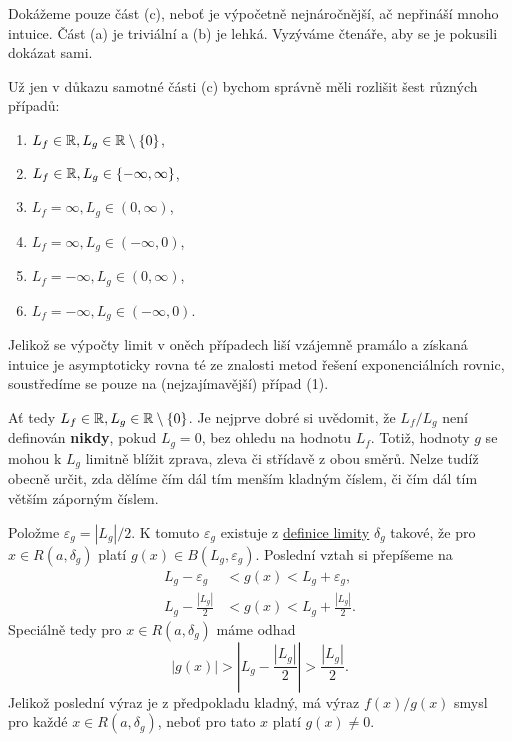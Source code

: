 \begin{thmproof}
 Dokážeme pouze část (c), neboť je výpočetně nejnáročnější, ač nepřináší mnoho
 intuice. Část (a) je triviální a (b) je lehká. Vyzýváme čtenáře, aby se je
 pokusili dokázat sami.

 Už jen v důkazu samotné části (c) bychom správně měli rozlišit šest různých
 případů:
 \begin{enumerate}
  \item $L_f \in \mathbb{R}, L_g \in \mathbb{R} \setminus \{0\}$,
  \item $L_f \in \mathbb{R}, L_g \in \{-\infty,\infty\}$,
  \item $L_f = \infty, L_g \in (0,\infty)$,
  \item $L_f = \infty, L_g \in (-\infty,0)$,
  \item $L_f = -\infty, L_g \in (0,\infty)$,
  \item $L_f = -\infty, L_g \in (-\infty,0)$.
 \end{enumerate}
 Jelikož se výpočty limit v oněch případech liší vzájemně pramálo a získaná
 intuice je asymptoticky rovna té ze znalosti metod řešení exponenciálních
 rovnic, soustředíme se pouze na (nejzajímavější) případ (1).

 Ať tedy $L_f \in \mathbb{R}, L_g \in \mathbb{R} \setminus \{0\}$. Je nejprve dobré si uvědomit,
 že $L_f / L_g$ není definován \textbf{nikdy}, pokud $L_g = 0$, bez ohledu na
 hodnotu $L_f$. Totiž, hodnoty $g$ se mohou k $L_g$ limitně blížit zprava,
 zleva či střídavě z obou směrů. Nelze tudíž obecně určit, zda dělíme čím dál
 tím menším kladným číslem, či čím dál tím větším záporným číslem.

 Položme $\varepsilon_g = |L_g| / 2$. K tomuto $\varepsilon_g$ existuje z
 \hyperref[def:oboustranna-limita-funkce]{definice limity} $\delta_g$ takové, že
 pro $x \in R(a,\delta_g)$ platí $g(x) \in B(L_g,\varepsilon_g)$. Poslední vztah
 si přepíšeme na
 \begin{align*}
  L_g - \varepsilon_g & < g(x) < L_g + \varepsilon_g,\\
  L_g - \frac{|L_g|}{2} & < g(x) < L_g + \frac{|L_g|}{2}.
 \end{align*}
 Speciálně tedy pro $x \in R(a,\delta_g)$ máme odhad
 \[
  |g(x)| > \left| L_g - \frac{|L_g|}{2} \right| > \frac{|L_g|}{2}.
 \]
 Jelikož poslední výraz je z předpokladu kladný, má výraz $f(x) / g(x)$ smysl
 pro každé $x \in R(a,\delta_g)$, neboť pro tato $x$ platí $g(x) \neq 0$.


\end{thmproof}
